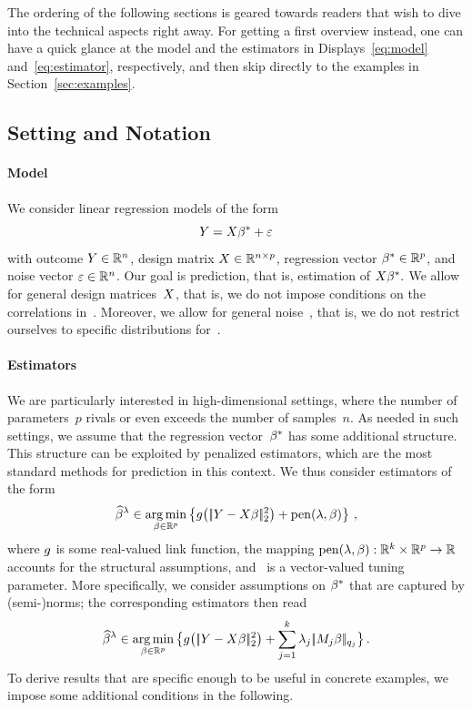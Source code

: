 \documentclass[bj]{imsart}
\newcommand{\normtwo}[1]{\ensuremath{\!|\!| #1 | \! |_{2}}}
\newcommand{\normqj}[1]{\ensuremath{\!|\!| #1 | \! |_{q_j}}}
\newcommand{\1}{{\rm 1}\mskip -4,5mu{\rm l} }
\newcommand{\argmin}{\mathop{\mathrm{arg\,min}}}
\def\R{\mathbb{R}}
\newcommand{\rp}{\mathbb{R}^p}
\newcommand{\rn}{\mathbb{R}^n}
\begin{document}
The ordering of the following sections is geared towards readers that wish to dive into the technical aspects right away. For getting a first overview instead, one can have a quick glance at the model and the estimators in Displays~\eqref{eq:model} and~\eqref{eq:estimator}, respectively, and then skip directly to the examples in Section~\ref{sec:examples}.%
\subsection*{Setting and Notation}\label{sec:setting}
\paragraph{Model} We consider linear regression models of the form
\begin{equation}
  \label{eq:model}
  \textcolor{black}{Y}= \textcolor{black}{X}\textcolor{black}{\beta^*} +\textcolor{black}{\varepsilon}
\end{equation}
with outcome $\outcome\in\rn$, design matrix $\design\in\R^{n\times p}$, regression vector $\truth\in\rp$, and noise vector $\noise\in\rn$. Our goal is prediction, that is, estimation of $\textcolor{black}{X}\textcolor{black}{\beta^*}.$ We allow for general design matrices~$\textcolor{black}{X}$, that is, we do not impose conditions on the correlations in~\design. Moreover, we allow for general  noise~\noise, that is, we do not restrict ourselves to specific distributions for~\noise.

\paragraph{Estimators} We are particularly interested in high-dimensional settings, where the number of parameters~$p$ rivals or even exceeds the number of samples~$n$. As needed in such settings, we assume that the regression vector~$\textcolor{black}{\beta^*}$ has some additional structure. This structure can be exploited by penalized estimators, which are the most standard methods for prediction in this context. We thus consider estimators of the form
\begin{equation*}
  \estimatort \in \argmin_{\beta\in\rp}\left\{\linkfunction\big(\,\normtwo{\outcome-\design\beta}^2\big)+\operatorname{pen}(\tuningparameter,\beta)\right\}\,,
\end{equation*}
where $g$ is some real-valued link function, the mapping $\operatorname{pen}(\tuningparameter,\beta):\R^k\times\R^p\to\R$ accounts for the structural assumptions, and \tuningparameter\ is a vector-valued tuning parameter. More specifically, we consider assumptions on $\textcolor{black}{\beta^*}$ that are captured by (semi-)norms; the corresponding estimators then read 
\begin{equation}
  \label{eq:estimator}
  \estimatort \in \argmin_{\beta\in\rp}\big\{\linkfunction\big(\,\normtwo{\outcome-\design\beta}^2\big)+\sum_{j=1}^\numbergroups\tuningparameter_j\,\normqj{\fusedmatrix_j\beta}\big\}\,.
\end{equation}
To derive results that are specific enough to be useful in concrete examples, we impose some additional conditions in the following.
\end{document}

